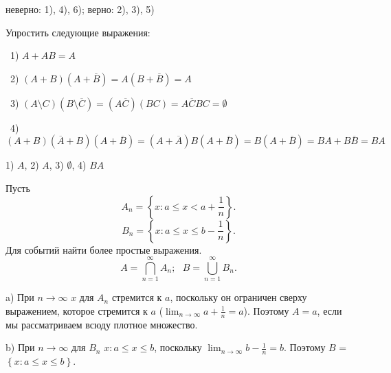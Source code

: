 \medskip
\begin{result}
неверно: 1), 4), 6); верно: 2), 3), 5)
\end{result}


\medskip
\begin{task}{3}
Упростить следующие выражения:
\end{task}

\begin{solution}

\smallskip
\noindent~1) $A + AB = A$ 

\medskip
\noindent~2) $\left(A + B\right)\left(A + \overline{B}\right) = A \left(B + \overline{B}\right) = A$

\medskip
\noindent~3) $\left(A \setminus C\right)\left(B \setminus \overline{C}\right) = \left(A\overline{C}\right)
\left(BC\right) = A\overline{C}BC = \emptyset$

\medskip
\noindent~4) $\left(A + B\right)\left(\overline{A} + B\right)\left(A + \overline{B}\right) = 
\left(A + \overline{A}\right)B\left(A + \overline{B}\right) = B\left(A + \overline{B}\right) = 
BA + B\overline{B} = BA$
\end{solution}


\begin{result}
1) $A$, 2) $A$, 3) $\emptyset$, 4) $BA$
\end{result}


\medskip
\begin{task}{4}
Пусть
\[
  A_n = \left\{x: a \le x < a + \frac{1}{n}\right\} 
.\] 
\[
  B_n = \left\{x: a \le x \le b - \frac{1}{n}\right\} 
.\] 
Для событий найти более простые выражения.
\[
  A = \bigcap_{n = 1}^{\infty} A_n;~~~ B = \bigcup_{n = 1}^\infty B_n
.\] 
\end{task}

\begin{solution}

\smallskip
\noindent a) При $n \to \infty$ $x$ для $A_n$ стремится к $a$, поскольку он ограничен сверху
выражением, которое стремится к $a$ ($\lim_{n \to \infty} a + \frac{1}{n} = a$). Поэтому $A = a$, если мы рассматриваем всюду плотное множество.

\medskip
\noindent b) При $n \to \infty$ для $B_n$ $x : a \le x \le b$, поскольку $\lim_{n \to \infty} b - \frac{1}{n} = b $.
Поэтому $B$ = $\left\{x: a \le x \le b\right\}$.
\end{solution}

